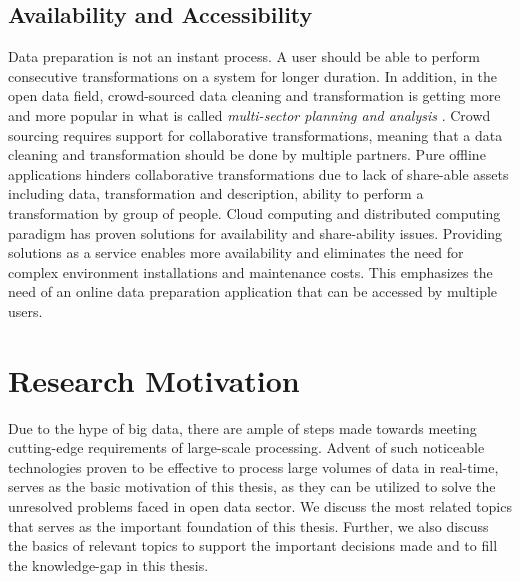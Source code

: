 \subsection{Availability and Accessibility}
\noindent Data preparation is not an instant process. A user should be able to perform consecutive transformations on a system for longer duration. In addition, in the open data field, crowd-sourced data cleaning and transformation is getting more and more popular in what is called \textit{multi-sector planning and analysis} \cite{multisectoranalysis}. Crowd sourcing requires support for collaborative transformations, meaning that a data cleaning and transformation should be done by multiple partners. Pure offline applications hinders collaborative transformations due to lack of share-able assets including data, transformation and description, ability to perform a transformation by group of people. Cloud computing and distributed computing paradigm has proven solutions for availability and share-ability issues. Providing solutions as a service enables more availability and eliminates the need for complex environment installations and maintenance costs. This emphasizes the need of an online data preparation application that can be accessed by multiple users.


\section{Research Motivation}
Due to the hype of big data, there are ample of steps made towards meeting cutting-edge requirements of large-scale processing. Advent of such noticeable technologies proven to be effective to process large volumes of data in real-time, serves as the basic motivation of this thesis, as they can be utilized to solve the unresolved problems faced in open data sector. We discuss the most related topics that serves as the important foundation of this thesis. Further, we also discuss the basics of relevant topics to support the important decisions made and to fill the knowledge-gap in this thesis. 

